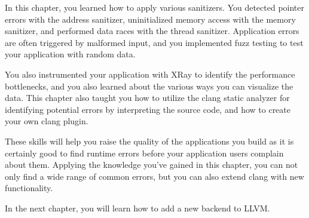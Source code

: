
In this chapter, you learned how to apply various sanitizers. You detected pointer errors with the address sanitizer, uninitialized memory access with the memory sanitizer, and performed data races with the thread sanitizer. Application errors are often triggered by malformed input, and you implemented fuzz testing to test your application with random data.

You also instrumented your application with XRay to identify the performance bottlenecks, and you also learned about the various ways you can visualize the data. This chapter also taught you how to utilize the clang static analyzer for identifying potential errors by interpreting the source code, and how to create your own clang plugin.

These skills will help you raise the quality of the applications you build as it is certainly good to find runtime errors before your application users complain about them. Applying the knowledge you’ve gained in this chapter, you can not only find a wide range of common errors, but you can also extend clang with new functionality.

In the next chapter, you will learn how to add a new backend to LLVM.




























